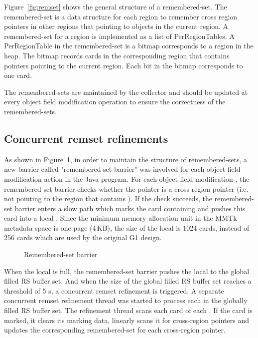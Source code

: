 Figure~\ref{fig:remset} shows the general structure of a remembered-set.
The remembered-set \citep{hosking1993remembered} is a data structure for each region to remember cross
region pointers in other regions that pointing to objects in the current region.
A remembered-set for a region is implemented as a list of PerRegionTables.
A PerRegionTable in the remembered-set is a bitmap corresponds to a region in the heap.
The bitmap records cards in the corresponding region that contains pointers pointing to the
current region. Each bit in the bitmap corresponds to one card.

\begin{figure*}
  \centering
  \texttt{[image: \{figs/remset.pdf]}}
  \caption{Remembered-set structure}
  \label{fig:remset}
\end{figure*}

The remembered-sets are maintained by the collector and should be updated
at every object field modification operation to ensure the correctness of the remembered-sets.

\subsection{Concurrent remset refinements}

As shown in Figure~\ref{fig:remsetbarrier}, in order to maintain the structure of remembered-sets,
a new barrier called "remembered-set barrier" was involved for each object field modification action in the Java program.
For each object field modification , the remembered-set barrier checks
whether the pointer  is a cross region pointer (i.e. not pointing to the region that contains ).
If the check succeeds, the remembered-set barrier enters a slow path which marks the
card containing  and pushes this card into a local .
Since the minimum memory allocation unit in the MMTk metadata space is one page (4\,KB), the size of
the local  is 1024 cards, instead of 256 cards which are used by the original G1 design.

\begin{figure}
  \centering
  
  \caption{Remembered-set barrier}
  \label{fig:remsetbarrier}
\end{figure}

When the local  is full, the remembered-set barrier
pushes the local  to the global filled RS buffer set.
And when the size of the global filled RS buffer set reaches a threshold of 5 s,
a concurrent remset refinement is triggered.
A separate concurrent remset refinement thread was started to process each
 in the globally filled RS buffer set.
The refinement thread scans each card of each .
If the card is marked, it clears its marking data, linearly scans it for cross-region pointers
and updates the corresponding remembered-set for each cross-region pointer.

